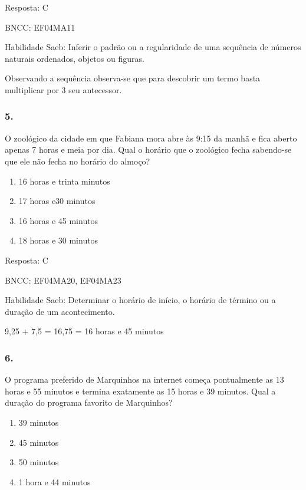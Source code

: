 Resposta: C

BNCC: EF04MA11

Habilidade Saeb: Inferir o padrão ou a regularidade de uma sequência de
números naturais ordenados, objetos ou figuras.

Observando a sequência observa-se que para descobrir um termo basta
multiplicar por 3 seu antecessor.

\subsubsection{5.}\label{section-176}

O zoológico da cidade em que Fabiana mora abre às 9:15 da manhã e fica
aberto apenas 7 horas e meia por dia. Qual o horário que o zoológico
fecha sabendo-se que ele não fecha no horário do almoço?

\begin{enumerate}
\def\labelenumi{\alph{enumi})}
\item
  16 horas e trinta minutos
\item
  17 horas e30 minutos
\item
  16 horas e 45 minutos
\item
  18 horas e 30 minutos
\end{enumerate}

Resposta: C

BNCC: EF04MA20, EF04MA23

Habilidade Saeb: Determinar o horário de início, o horário de término ou
a duração de um acontecimento.

9,25 + 7,5 = 16,75 = 16 horas e 45 minutos

\subsubsection{6.}\label{section-177}

O programa preferido de Marquinhos na internet começa pontualmente as 13
horas e 55 minutos e termina exatamente as 15 horas e 39 minutos. Qual a
duração do programa favorito de Marquinhos?

\begin{enumerate}
\def\labelenumi{\alph{enumi})}
\item
  39 minutos
\item
  45 minutos
\item
  50 minutos
\item
  1 hora e 44 minutos
\end{enumerate}

